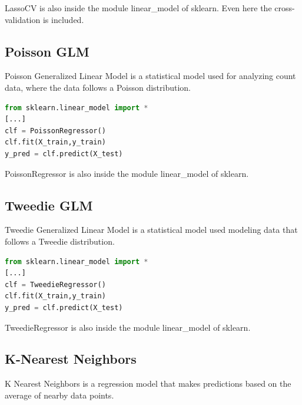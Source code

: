 LassoCV is also inside the module linear\_model of sklearn. Even here the cross-validation is included.
\subsection{Poisson GLM}

Poisson Generalized Linear Model is a statistical model used for analyzing count data, where the data follows a Poisson distribution. 

\begin{lstlisting}[language=Python, caption=Poisson-GLM implementation]
from sklearn.linear_model import *
[...]
clf = PoissonRegressor()
clf.fit(X_train,y_train)
y_pred = clf.predict(X_test)
\end{lstlisting}

PoissonRegressor is also inside the module linear\_model of sklearn.
\subsection{Tweedie GLM}

Tweedie Generalized Linear Model is a statistical model used modeling data that follows a Tweedie distribution. 

\begin{lstlisting}[language=Python, caption=Tweedie-GLM implementation]
from sklearn.linear_model import *
[...]
clf = TweedieRegressor()
clf.fit(X_train,y_train)
y_pred = clf.predict(X_test)
\end{lstlisting}

TweedieRegressor is also inside the module linear\_model of sklearn.

\subsection{K-Nearest Neighbors}

K Nearest Neighbors is a regression model that makes predictions based on the average of nearby data points.

